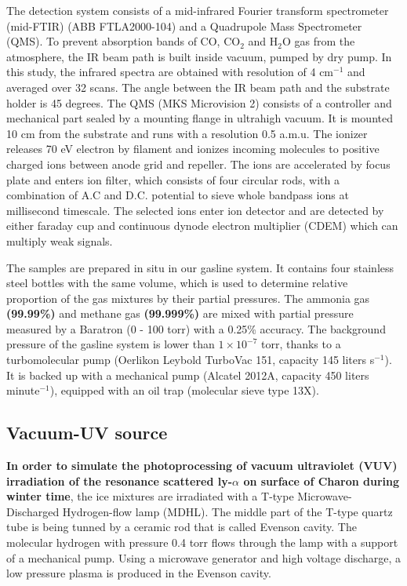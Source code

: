 The detection system consists of a mid-infrared Fourier transform spectrometer (mid-FTIR) (ABB FTLA2000-104) and a Quadrupole Mass Spectrometer (QMS). To prevent absorption bands of CO, CO$_2$ and H$_2$O gas from the atmosphere, the IR beam path is built inside vacuum, pumped by dry pump. In this study, the infrared spectra are obtained with resolution of 4 cm$^{-1}$ and averaged over 32 scans. The angle between the IR beam path and the substrate holder is 45 degrees. The QMS (MKS Microvision 2) consists of a controller and mechanical part sealed by a mounting flange in ultrahigh vacuum. It is mounted 10 cm from the substrate and runs with a resolution 0.5 a.m.u. The ionizer releases 70 eV electron by filament and ionizes incoming molecules to positive charged ions between anode grid and repeller. The ions are accelerated by focus plate and enters ion filter, which consists of four circular rods, with a combination of A.C and D.C. potential to sieve whole bandpass ions at millisecond timescale. The selected ions enter ion detector and are detected by either faraday cup and continuous dynode electron multiplier (CDEM) which can multiply weak signals.

The samples are prepared in situ in our gasline system. It contains four stainless steel bottles with the same volume, which is used to determine relative proportion of the gas mixtures by their partial pressures. The ammonia gas \textbf{(99.99\%)} and methane gas \textbf{(99.999\%)} are mixed with partial pressure measured by a Baratron (0 - 100 torr) with a 0.25\% accuracy. The background pressure of the gasline system is lower than $1 \times 10^{-7}$ torr, thanks to a turbomolecular pump (Oerlikon Leybold TurboVac 151, capacity 145 liters s$^{-1}$). It is backed up with a mechanical pump (Alcatel 2012A, capacity 450 liters minute$^{-1}$), equipped with an oil trap (molecular sieve type 13X).

\subsection{Vacuum-UV source}
\label{sec:Vacuum_UV_source}

\textbf{In order to simulate the photoprocessing of vacuum ultraviolet (VUV) irradiation of the resonance scattered ly-$\alpha$ on surface of Charon during winter time}, the ice mixtures are irradiated with a T-type Microwave-Discharged Hydrogen-flow lamp (MDHL). The middle part of the T-type quartz tube is being tunned by a ceramic rod that is called Evenson cavity. The molecular hydrogen with pressure 0.4 torr flows through the lamp with a support of a mechanical pump. Using a  microwave generator and high voltage discharge, a low pressure plasma is produced in the Evenson cavity.

